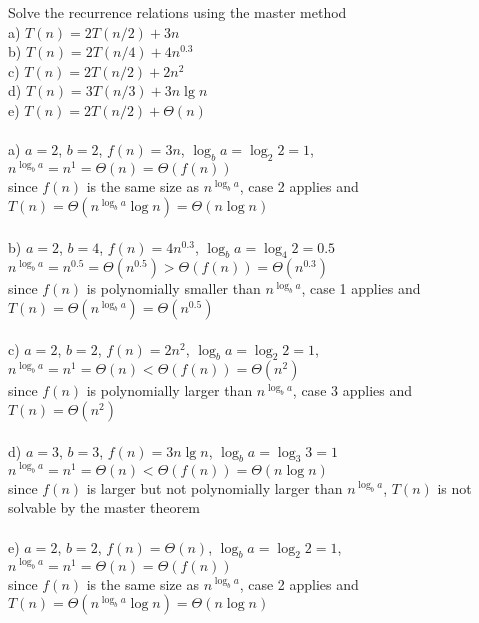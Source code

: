 \documentclass[12pt]{article}
\newenvironment{problem}[2][Problem]{\begin{trivlist}
\item[\hskip \labelsep {\bfseries #1}\hskip \labelsep {\bfseries #2.}]}{\end{trivlist}}
\begin{document}
\begin{problem}{2}
    Solve the recurrence relations using the master method\\
    a) $T(n) = 2T(n/2) + 3n$\\
    b) $T(n) = 2T(n/4) + 4n^{0.3}$\\
    c) $T(n) = 2T(n/2) + 2n^2$\\
    d) $T(n) = 3T(n/3) + 3n\lg{n}$\\
    e) $T(n) = 2T(n/2) + \Theta(n)$\\\\
    a) $a = 2$, $b = 2$, $f(n) = 3n$, $\log_b{a} = \log_2{2} = 1$, $n^{\log_b{a}} = n^1 = \Theta(n) = \Theta(f(n))$\\
    since $f(n)$ is the same size as $n^{\log_b{a}}$, case 2 applies and $T(n) = \Theta(n^{\log_b{a}}\log{n}) = \Theta(n\log{n})$\\\\
    b) $a = 2$, $b = 4$, $f(n) = 4n^{0.3}$, $\log_b{a} = \log_4{2} = 0.5$\\ 
    $n^{\log_b{a}} = n^{0.5} = \Theta(n^{0.5}) > \Theta(f(n)) = \Theta(n^{0.3})$\\
    since $f(n)$ is polynomially smaller than $n^{\log_b{a}}$, case 1 applies and $T(n) = \Theta(n^{\log_b{a}}) = \Theta(n^{0.5})$\\\\
    c) $a = 2$, $b = 2$, $f(n) = 2n^2$, $\log_b{a} = \log_2{2} = 1$, $n^{\log_b{a}} = n^1 = \Theta(n) < \Theta(f(n)) = \Theta(n^2)$\\
    since $f(n)$ is polynomially larger than $n^{\log_b{a}}$, case 3 applies and $T(n) = \Theta(n^2)$\\\\
    d) $a = 3$, $b = 3$, $f(n) = 3n\lg{n}$, $\log_b{a} = \log_3{3} = 1$\\
    $n^{\log_b{a}} = n^{1} = \Theta(n) < \Theta(f(n)) = \Theta(n\log{n})$\\
    since $f(n)$ is larger but not polynomially larger than $n^{\log_b{a}}$, $T(n)$ is not solvable by the master theorem\\\\
    e) $a = 2$, $b = 2$, $f(n) = \Theta(n)$, $\log_b{a} = \log_2{2} = 1$, $n^{\log_b{a}} = n^1 = \Theta(n) = \Theta(f(n))$\\
    since $f(n)$ is the same size as $n^{\log_b{a}}$, case 2 applies and $T(n) = \Theta(n^{\log_b{a}}\log{n}) = \Theta(n\log{n})$\\\\
\end{problem}
 
\end{document}
